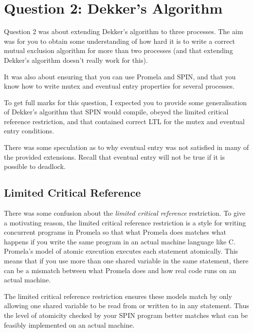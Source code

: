 \documentclass{article}
\begin{document}
\section{Question 2: Dekker's Algorithm}

Question 2 was about extending Dekker's algorithm to three processes.
The aim was for you to obtain some understanding of how hard it is to write
a correct mutual exclusion algorithm for more than two processes
(and that extending Dekker's algorithm doesn't really work for this).

It was also about ensuring that you can use Promela and SPIN,
and that you know how to write mutex and eventual entry properties for several
processes.

To get full marks for this question, I expected you to provide some generalisation
of Dekker's algorithm that SPIN would compile, obeyed the limited critical reference restriction, and that contained correct LTL for the mutex and eventual entry conditions.

There was some speculation as to why eventual entry was not satisfied in many of the
provided extensions. Recall that eventual entry will not be true if it is possible to deadlock.


\subsection{Limited Critical Reference}

There was some confusion about the \emph{limited critical reference} restriction.
To give a motivating reason, the limited critical reference restriction is a style for writing
concurrent programs in Promela so that what Promela does matches what happens
if you write the same program in an actual machine language like C.
Promela's model of atomic execution executes each statement atomically.
This means that if you use more than one shared variable in the same statement,
there can be a mismatch between what Promela does and how real code runs on an actual machine.

The limited critical reference restriction ensures these models match by
only allowing one shared variable to be read from or written to in any statement.
Thus the level of atomicity checked by your SPIN program better matches what
can be feasibly implemented on an actual machine.
\end{document}
